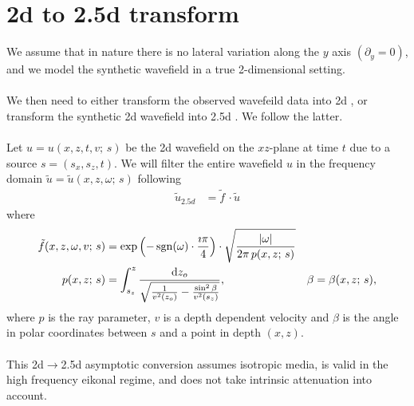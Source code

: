 \documentclass[a4paper,12pt]{article}
\title{}
\author{}
\date{}
\begin{document}
\section*{2d to 2.5d transform}
We assume that in nature there is no lateral variation along the $y$ axis $(\partial_y=0)$, and we model the synthetic wavefield in a true 2-dimensional setting.
\\\\
We then need to either transform the observed wavefeild data into 2d \cite[]{ernst2007application}, or transform the synthetic 2d wavefield into 2.5d \cite[]{bleistein1986two}. We follow the latter.
\\\\
Let $u=u(x,z,t,v; \, s)$ be the 2d wavefield on the $xz$-plane at time $t$ due to a source $s=(s_x,s_z,t)$. We will filter the entire wavefield $u$ in the frequency domain $\tilde{u}=\tilde{u}(x,z,\omega;\, s)$ following  
\begin{align}
\tilde{u}_{2.5d} &= \tilde{f}\,\cdot\tilde{u}
\end{align}
where
\begin{align}
\tilde{f}(x,z,\omega,v;\,s) &= \exp\left(-\operatorname{sgn}(\omega) \cdot \frac{\imath\pi}{4}\right)\cdot\sqrt{\frac{|\omega|}{2\pi \, p(x,z;\,s)}} \\
p(x,z;\,s) &= \int_{s_z}^{z} \frac{{\rm d}z_o}{\sqrt{ \frac{1}{v^2(z_o)} - \frac{\sin^2\beta}{v^2(s_z)} }}, & \beta=\beta(x,z;\,s),
\end{align}
where $p$ is the ray parameter, $v$ is a depth dependent velocity and $\beta$ is the angle in polar coordinates between $s$ and a point in depth $(x,z)$.
\\\\
This 2d$\to$2.5d asymptotic conversion assumes isotropic media, is valid in the high frequency eikonal regime, and does not take intrinsic attenuation into account.
%
\end{document}
